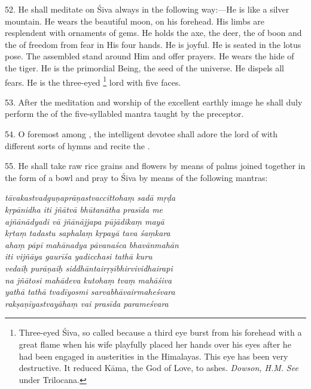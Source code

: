 52. He shall meditate on Śiva always in the following way:—He is like a silver
mountain. He wears the beautiful moon, on his forehead. His limbs are
resplendent with ornaments of gems. He holds the axe, the deer, the 
of boon and the  of freedom from fear in His four hands. He is joyful.
He is seated in the lotus pose. The assembled  stand around Him and
offer prayers. He wears the hide of the tiger. He is the primordial Being,
the seed of the universe. He dispels all fears. He is the three-eyed
\footnote{Three-eyed Śiva, so called because a third eye burst from his forehead
with a great flame when his wife playfully placed her hands over his eyes after
he had been engaged in austerities in the Himalayas. This eye has been very
destructive. It reduced Kāma, the God of Love, to ashes. \emph{Dowson, H.M.}
\emph{See} under Trilocana.} lord with five faces.

53. After the meditation and worship of the excellent earthly image he shall
duly perform the  of the five-syllabled mantra taught by the preceptor.

54. O foremost among , the intelligent devotee shall adore
the lord of  with different sorts of hymns and recite
the .

55. He shall take raw rice grains and flowers by means of palms joined together
in the form of a bowl and pray to Śiva by means of the following mantras:

\begin{shloka}\itshape
  tāvakastvadguṇaprāṇastvaccittohaṃ sadā mṛḍa \\
  kṛpānidha iti jñātvā bhūtanātha prasīda me \\

  ajñānādyadi vā jñānājjapa pūjādikaṃ mayā \\
  kṛtaṃ tadastu saphalaṃ kṛpayā tava śaṃkara \\

  ahaṃ pāpī mahānadya pāvanaśca bhavānmahān \\
  iti vijñāya gaurīśa yadicchasi tathā kuru \\

  vedaiḥ purāṇaiḥ siddhāntairṛṣibhirvividhairapi \\
  na jñātosi mahādeva kutohaṃ tvaṃ mahāśiva \\

  yathā tathā tvadīyosmi sarvabhāvairmaheśvara \\
  rakṣaṇīyastvayāhaṃ vai prasīda parameśvara
\end{shloka}

